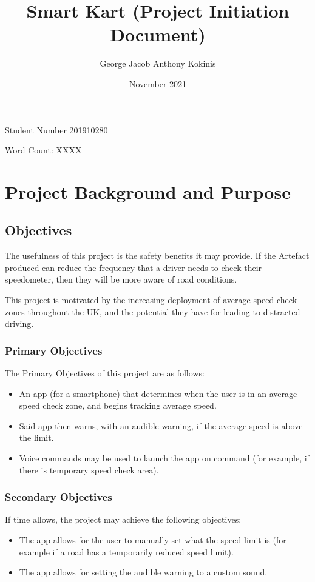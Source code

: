 \documentclass[11pt, a4paper, notitlepage]{report}
\title{Smart Kart (Project Initiation Document)}
\date{November 2021}
\author{George Jacob Anthony Kokinis}
\begin{document}
\maketitle
\begin{center}
    Student Number 201910280

    Word Count: XXXX
\end{center}
\newpage
\tableofcontents

\chapter{Project Background and Purpose}
\section{Objectives}
The usefulness of this project is the safety benefits it may provide. If the 
Artefact produced can reduce the frequency that a driver needs to check their 
speedometer, then they will be more aware of road conditions.

This project is motivated by the increasing deployment of average speed check 
zones throughout the UK, and the potential they have for leading to distracted 
driving.

\subsection{Primary Objectives} \label{PrimaryObjectives}
The Primary Objectives of this project are as follows:
\begin{itemize}
    \item An app (for a smartphone) that determines when the user is in an 
average speed check zone, and begins tracking average speed.
    \item Said app then warns, with an audible warning, if the average speed 
is above the limit.
    \item Voice commands may be used to launch the app on command (for 
example, if there is temporary speed check area).
\end{itemize}
\subsection{Secondary Objectives}
If time allows, the project may achieve the following objectives:
\begin{itemize}
    \item The app allows for the user to manually set what the speed limit is 
(for example if a road has a temporarily reduced speed limit).
    \item The app allows for setting the audible warning to a custom sound.
\end{itemize}
\end{document}
